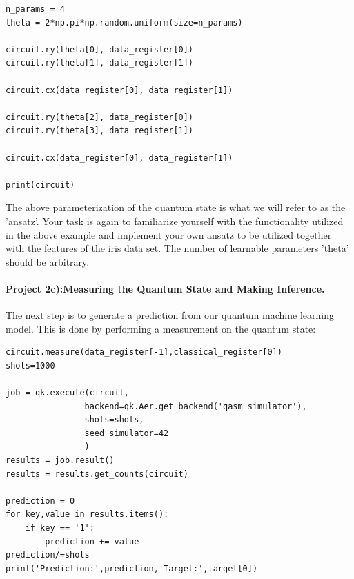 \documentclass[%
oneside,                 %
final,                   %
10pt]{article}
\begin{document}
\begin{verbatim}
n_params = 4
theta = 2*np.pi*np.random.uniform(size=n_params)

circuit.ry(theta[0], data_register[0])
circuit.ry(theta[1], data_register[1])

circuit.cx(data_register[0], data_register[1])

circuit.ry(theta[2], data_register[0])
circuit.ry(theta[3], data_register[1])

circuit.cx(data_register[0], data_register[1])

print(circuit)

\end{verbatim}


The above parameterization of the quantum state is what we will refer
to as the 'ansatz'. Your task is again to familiarize yourself with
the functionality utilized in the above example and implement your own
ansatz to be utilized together with the features of the
iris data set. The number of learnable parameters 'theta'
should be arbitrary.

\paragraph{Project 2c):Measuring the Quantum State and Making Inference.}
The next step is to generate a prediction from our quantum machine learning model. This is done by performing a measurement on the quantum state:



















\begin{verbatim}
circuit.measure(data_register[-1],classical_register[0])
shots=1000

job = qk.execute(circuit,
                backend=qk.Aer.get_backend('qasm_simulator'),
                shots=shots,
                seed_simulator=42
                )
results = job.result()
results = results.get_counts(circuit)

prediction = 0
for key,value in results.items():
    if key == '1':
        prediction += value
prediction/=shots
print('Prediction:',prediction,'Target:',target[0])

\end{verbatim}
\end{document}
